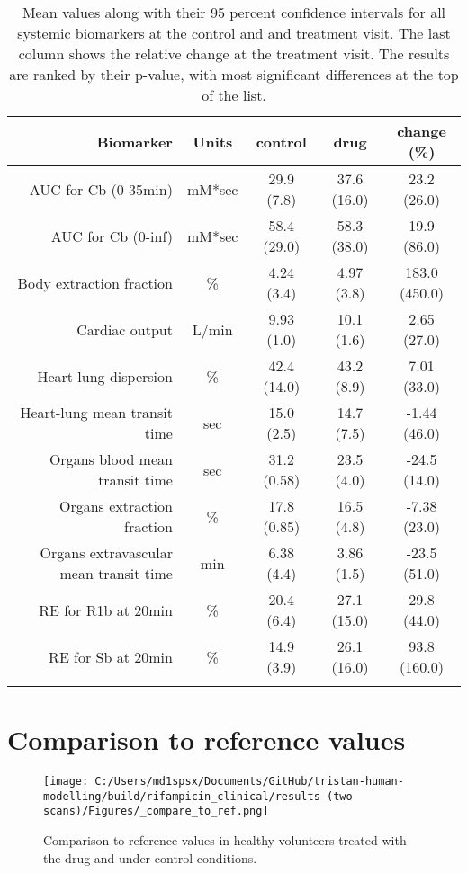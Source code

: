 \documentclass{epflreport}%
\begin{document}
\begin{longtable}{rcccc}%
\hline%
Biomarker&Units&control&drug&change (\%)\\%
\hline%
AUC for Cb (0{-}35min)&mM*sec&29.9 (7.8) &37.6 (16.0) &23.2 (26.0) \\%
AUC for Cb (0{-}inf)&mM*sec&58.4 (29.0) &58.3 (38.0) &19.9 (86.0) \\%
Body extraction fraction&\%&4.24 (3.4) &4.97 (3.8) &183.0 (450.0) \\%
Cardiac output&L/min&9.93 (1.0) &10.1 (1.6) &2.65 (27.0) \\%
Heart{-}lung dispersion&\%&42.4 (14.0) &43.2 (8.9) &7.01 (33.0) \\%
Heart{-}lung mean transit time&sec&15.0 (2.5) &14.7 (7.5) &{-}1.44 (46.0) \\%
Organs blood mean transit time&sec&31.2 (0.58) &23.5 (4.0) &{-}24.5 (14.0) \\%
Organs extraction fraction&\%&17.8 (0.85) &16.5 (4.8) &{-}7.38 (23.0) \\%
Organs extravascular mean transit time&min&6.38 (4.4) &3.86 (1.5) &{-}23.5 (51.0) \\%
RE for R1b at 20min&\%&20.4 (6.4) &27.1 (15.0) &29.8 (44.0) \\%
RE for Sb at 20min&\%&14.9 (3.9) &26.1 (16.0) &93.8 (160.0) \\%
\hline%
\caption{Mean values along with their 95 percent confidence intervals for all systemic biomarkers at the control and and treatment visit. The last column shows the relative change at the treatment visit. The results are ranked by their p-value, with most significant differences at the top of the list.} \\%
\end{longtable}%
\clearpage%
\section{Comparison to reference values}%
\label{sec:Comparisontoreferencevalues}%

%


\begin{figure}[h!]%
\centering%
\texttt{[image: C:/Users/md1spsx/Documents/GitHub/tristan-human-modelling/build/rifampicin\_clinical/results (two scans)/Figures/\_compare\_to\_ref.png]}%
\caption{Comparison to reference values in healthy volunteers treated with the drug and under control conditions.}%
\end{figure}

%
\clearpage%
\end{document}
